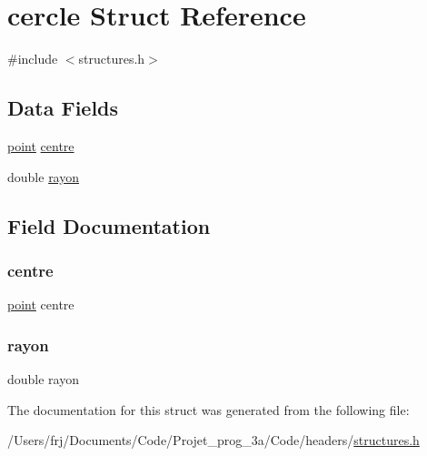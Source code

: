 \hypertarget{structcercle}{}\section{cercle Struct Reference}
\label{structcercle}


{\ttfamily \#include $<$structures.\+h$>$}

\subsection*{Data Fields}
\begin{DoxyCompactItemize}
\item 
\hyperlink{structpoint}{point} \hyperlink{structcercle_a9c1fef0a1dbe602bb367f77511d36b3d}{centre}
\item 
double \hyperlink{structcercle_a2459aedac9f8646ad9566164a9a83f41}{rayon}
\end{DoxyCompactItemize}


\subsection{Field Documentation}
\hypertarget{structcercle_a9c1fef0a1dbe602bb367f77511d36b3d}{}\label{structcercle_a9c1fef0a1dbe602bb367f77511d36b3d} 
\subsubsection{\texorpdfstring{centre}{centre}}
{\footnotesize\ttfamily \hyperlink{structpoint}{point} centre}

\hypertarget{structcercle_a2459aedac9f8646ad9566164a9a83f41}{}\label{structcercle_a2459aedac9f8646ad9566164a9a83f41} 
\subsubsection{\texorpdfstring{rayon}{rayon}}
{\footnotesize\ttfamily double rayon}



The documentation for this struct was generated from the following file\+:\begin{DoxyCompactItemize}
\item 
/\+Users/frj/\+Documents/\+Code/\+Projet\+\_\+prog\+\_\+3a/\+Code/headers/\hyperlink{structures_8h}{structures.\+h}\end{DoxyCompactItemize}
